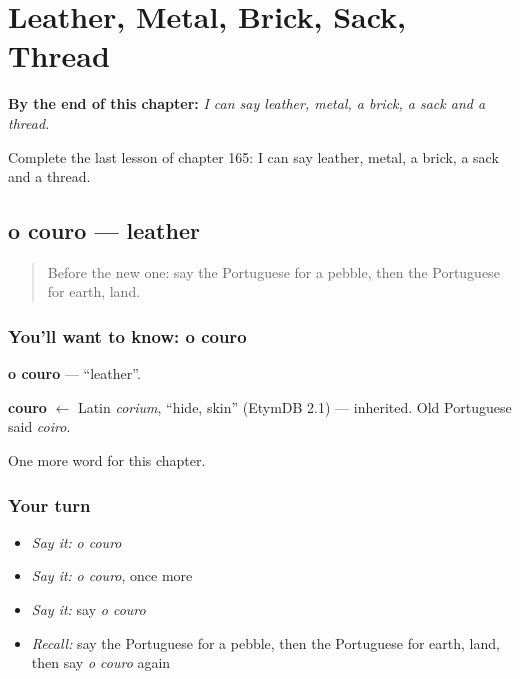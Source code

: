 
\chapter{Leather, Metal, Brick, Sack, Thread}
\label{ch:pt-leather-metal-brick-sack-thread}

\begin{chapteropening}
\textbf{By the end of this chapter:} \emph{I can say leather, metal, a brick, a sack and a thread.}

Complete the last lesson of chapter 165: I can say leather, metal, a brick, a sack and a thread.
\end{chapteropening}

\section[o couro]{o couro — leather}

\label{lesson:PT-C165-couro}



\begin{quote}
Before the new one: say the Portuguese for a pebble, then the Portuguese for earth, land.
\end{quote}

\subsection*{You'll want to know: o couro}
\textbf{o couro} — \textquotedblleft{}leather\textquotedblright{}.

\begin{cousinweb}
\textbf{couro} $\leftarrow$ Latin \emph{corium}, \textquotedblleft{}hide, skin\textquotedblright{} (EtymDB 2.1) — inherited. Old Portuguese said \emph{coiro}.
\end{cousinweb}

\begin{grammarlens}[title={What you've built}]
One more word for this chapter.
\end{grammarlens}

\subsection*{Your turn}
\begin{itemize}
\raggedright
  \item \emph{Say it:} \emph{o couro}
  \item \emph{Say it:} \emph{o couro}, once more
  \item \emph{Say it:} say \emph{o couro}
  \item \emph{Recall:} say the Portuguese for a pebble, then the Portuguese for earth, land, then say \emph{o couro} again
\end{itemize}

